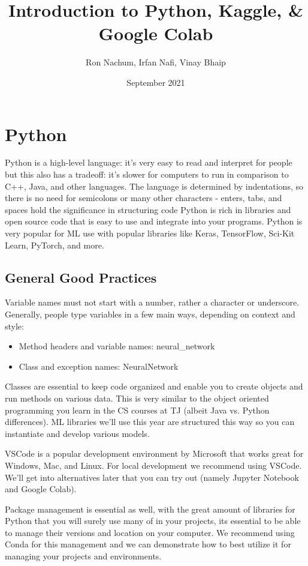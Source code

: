 \documentclass{article}
\title{Introduction to Python, Kaggle, & Google Colab}
\author{Ron  Nachum, Irfan Nafi, Vinay Bhaip}
\date{September 2021}
\begin{document}
\maketitle

\section{Python}

Python is a high-level language: it's very easy to read and interpret for people but this also has a tradeoff: it's slower for computers to run in comparison to C++, Java, and other languages. The language is determined by indentations, so there is no need for semicolons or many other characters - enters, tabs, and spaces hold the significance in structuring code Python is rich in libraries and open source code that is easy to use and integrate into your programs. Python is very popular for ML use with popular libraries like Keras, TensorFlow, Sci-Kit Learn, PyTorch, and more.

\subsection{General Good Practices}

Variable names must not start with a number, rather a character or underscore. Generally, people type variables in a few main ways, depending on context and style:

\begin{itemize}
    \item Method headers and variable names: neural\_network
    \item Class and exception names: NeuralNetwork
\end{itemize}


Classes are essential to keep code organized and enable you to create objects and run methods on various data. This is very similar to the object oriented programming you learn in the CS courses at TJ (albeit Java vs. Python differences). ML libraries we'll use this year are structured this way so you can instantiate and develop various models.

VSCode is a popular development environment by Microsoft that works great for Windows, Mac, and Linux. For local development we recommend using VSCode. We'll get into alternatives later that you can try out (namely Jupyter Notebook and Google Colab).

Package management is essential as well, with the great amount of libraries for Python that you will surely use many of in your projects, its essential to be able to manage their versions and location on your computer. We recommend using Conda for this management and we can demonstrate how to best utilize it for managing your projects and environments.
\end{document}
